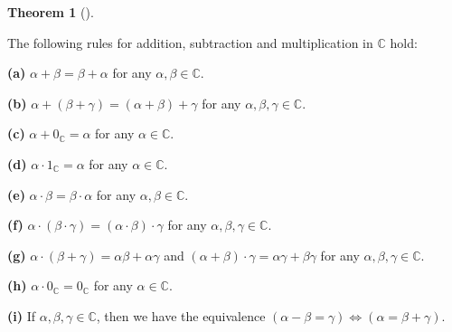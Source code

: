 \documentclass[numbers=enddot,12pt,final,onecolumn,notitlepage]{scrartcl}%
\numberwithin{exer}{subsection}
\theoremstyle{definition}
\newtheorem{theo}{Theorem}[subsection]
\newenvironment{theorem}[1][]
{\begin{theo}[#1]\begin{leftbar}}
{\end{leftbar}\end{theo}}
\begin{document}
\begin{theorem}
\label{thm.CC.CC.rules}The following rules for addition, subtraction and
multiplication in $\mathbb{C}$ hold:

\textbf{(a)} $\alpha+\beta=\beta+\alpha$ for any $\alpha,\beta\in\mathbb{C}$.

\textbf{(b)} $\alpha+\left(  \beta+\gamma\right)  =\left(  \alpha
+\beta\right)  +\gamma$ for any $\alpha,\beta,\gamma\in\mathbb{C}$.

\textbf{(c)} $\alpha+0_{\mathbb{C}}=\alpha$ for any $\alpha\in\mathbb{C}$.

\textbf{(d)} $\alpha\cdot1_{\mathbb{C}}=\alpha$ for any $\alpha\in\mathbb{C}$.

\textbf{(e)} $\alpha\cdot\beta=\beta\cdot\alpha$ for any $\alpha,\beta
\in\mathbb{C}$.

\textbf{(f)} $\alpha\cdot\left(  \beta\cdot\gamma\right)  =\left(  \alpha
\cdot\beta\right)  \cdot\gamma$ for any $\alpha,\beta,\gamma\in\mathbb{C}$.

\textbf{(g)} $\alpha\cdot\left(  \beta+\gamma\right)  =\alpha\beta
+\alpha\gamma$ and $\left(  \alpha+\beta\right)  \cdot\gamma=\alpha
\gamma+\beta\gamma$ for any $\alpha,\beta,\gamma\in\mathbb{C}$.

\textbf{(h)} $\alpha\cdot0_{\mathbb{C}}=0_{\mathbb{C}}$ for any $\alpha
\in\mathbb{C}$.

\textbf{(i)} If $\alpha,\beta,\gamma\in\mathbb{C}$, then we have the
equivalence $\left(  \alpha-\beta=\gamma\right)  \Longleftrightarrow\left(
\alpha=\beta+\gamma\right)  $.
\end{theorem}
\end{document}
